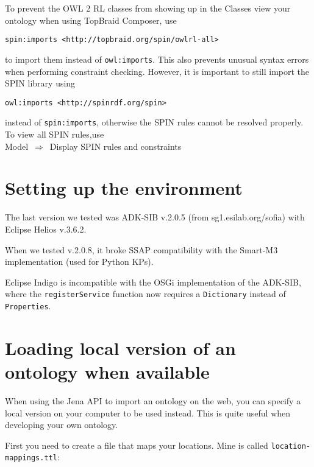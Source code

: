 To prevent the OWL 2 RL classes from showing up in the Classes view your ontology when using TopBraid Composer, use 

\begin{verbatim}
spin:imports <http://topbraid.org/spin/owlrl-all>
\end{verbatim}

to import them instead of \texttt{owl:imports}. This also prevents unusual syntax errors when performing constraint checking. However, it is important to still import the SPIN library using 

\begin{verbatim}
owl:imports <http://spinrdf.org/spin>
\end{verbatim}

instead of \texttt{spin:imports}, otherwise the SPIN rules cannot be resolved properly.\\

To view all SPIN rules,use\\

Model~$\Rightarrow$~Display SPIN rules and constraints



\section{Setting up the environment}

The last version we tested was ADK-SIB v.2.0.5 (from sg1.esilab.org/sofia) with Eclipse Helios v.3.6.2.

When we tested v.2.0.8, it broke SSAP compatibility with the Smart-M3 implementation (used for Python KPs).

Eclipse Indigo is incompatible with the OSGi implementation of the ADK-SIB, where the \texttt{registerService} function now requires a \texttt{Dictionary} instead of \texttt{Properties}.

\section{Loading local version of an ontology when available}

When using the Jena API to import an ontology on the web, you can specify a local version on your computer to be used instead. This is quite useful when developing your own ontology.

First you need to create a file that maps your locations. Mine is called \texttt{location-mappings.ttl}: 

